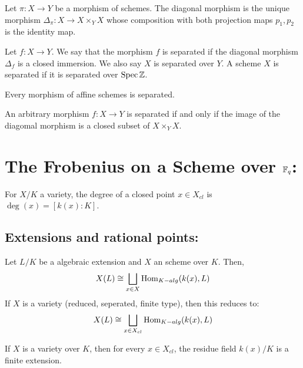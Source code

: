 \documentclass[12pt]{article}
\begin{document}
\begin{definition}
    Let $\pi: X \to Y$ be a morphism of schemes. The diagonal morphism is the unique morphism $\Delta_\pi: X \to X \times_Y X$ whose composition with both projection maps $p_1, p_2$ is the identity map.
\end{definition}

\begin{definition}
    Let $f: X \to Y$. We say that the morphism $f$ is separated if the diagonal morphism $\Delta_f$ is a closed immersion. We also say $X$ is separated over $Y$. A scheme $X$ is separated if it is separated over $\operatorname{Spec} \mathbb Z$. 
\end{definition}

\begin{proposition}
    Every morphism of affine schemes is separated.
\end{proposition}

\begin{corollary}
    An arbitrary morphism $f: X \to Y$ is separated if and only if the image of the diagomal morphism is a closed subset of $X \times_Y X$.
\end{corollary}

\section{The Frobenius on a Scheme over $\mathbb F_q$:}
\begin{definition}
    For $X/K$ a variety, the degree of a closed point $x \in X_{cl}$ is $\deg(x) = [k(x) : K]$.
\end{definition}

\subsection{Extensions and rational points:}
\begin{proposition}
    Let $L/K$ be a algebraic extension and $X$ an scheme over $K$. Then, 
    \[ X(L) \cong \bigsqcup_{x \in X} \operatorname{Hom}_{K-alg}(k(x), L)\]
    If $X$ is a variety (reduced, seperated, finite type), then this reduces to:
    \[ X(L) \cong \bigsqcup_{x \in X_{cl}} \operatorname{Hom}_{K-alg}(k(x), L)\]
\end{proposition}

\begin{proposition}
    If $X$ is a variety over $K$, then for every $x \in X_{cl}$, the residue field $k(x)/K$ is a finite extension. 
\end{proposition}
\end{document}
